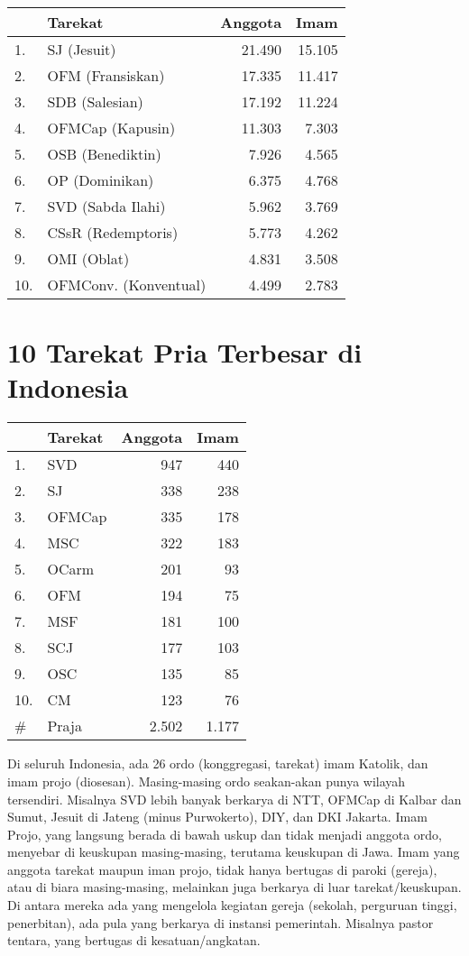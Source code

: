 \begin{tabular}{llrr}
\hline
&\textbf{Tarekat}&\textbf{Anggota}&\textbf{Imam}\\
\hline
1.	&SJ (Jesuit) 		&21.490	&15.105\\
2.	&OFM (Fransiskan)	&17.335	&11.417\\
3. 	&SDB (Salesian)		&17.192	&11.224\\
4.	&OFMCap (Kapusin)	&11.303	&7.303\\
5.	&OSB (Benediktin)	&7.926	&4.565\\
6.	&OP (Dominikan)		&6.375	&4.768\\
7.	&SVD (Sabda Ilahi)	&5.962	&3.769\\
8.	&CSsR (Redemptoris)	&5.773 	&4.262\\
9.	&OMI (Oblat)		&4.831	&3.508\\
10.	&OFMConv. (Konventual)	&4.499	&2.783\\
\hline
\end{tabular}

\section*{10 Tarekat Pria Terbesar di Indonesia}

\begin{tabular}{llrr}
\hline
&\textbf{Tarekat}&\textbf{Anggota}&\textbf{Imam}\\
\hline
1.	&SVD 	&947	&440\\
2.	&SJ 	&338	&238\\
3.	&OFMCap	&335	&178\\
4.	&MSC	&322	&183\\
5.	&OCarm 	&201	&93\\
6.	&OFM 	&194	&75\\
7.	&MSF	&181	&100\\
8.	&SCJ	&177	&103\\
9.	&OSC	&135	&85\\
10.	&CM		&123 	&76\\
\#	&Praja	&2.502	&1.177\\ \hline
\end{tabular}

Di seluruh Indonesia, ada 26 ordo (konggregasi, tarekat) imam Katolik, dan imam projo (diosesan). Masing-masing ordo seakan-akan punya wilayah tersendiri. Misalnya SVD lebih banyak berkarya di NTT, OFMCap di Kalbar dan Sumut, Jesuit di Jateng (minus Purwokerto), DIY, dan DKI Jakarta. Imam Projo, yang langsung berada di bawah uskup dan tidak menjadi anggota ordo, menyebar di keuskupan masing-masing, terutama keuskupan di Jawa. Imam yang anggota tarekat maupun iman projo, tidak hanya bertugas di paroki (gereja), atau di biara masing-masing, melainkan juga berkarya di luar tarekat/keuskupan. Di antara mereka ada yang mengelola kegiatan gereja (sekolah, perguruan tinggi, penerbitan), ada pula yang berkarya di instansi pemerintah. Misalnya pastor tentara, yang bertugas di kesatuan/angkatan.

